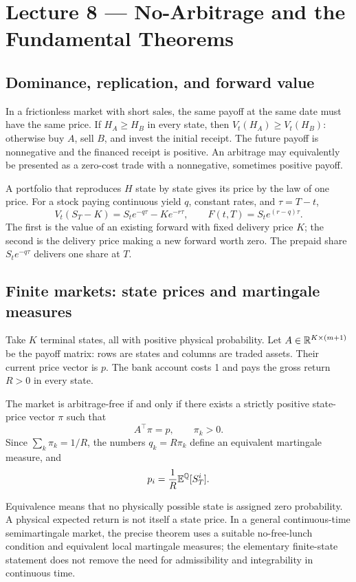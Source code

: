 
\section{Lecture 8 --- No-Arbitrage and the Fundamental Theorems}
\label{syn:lecture8}

\subsection{Dominance, replication, and forward value}
In a frictionless market with short sales, the same payoff at the same date
must have the same price. If \(H_A\geq H_B\) in every state, then
\(V_t(H_A)\geq V_t(H_B)\): otherwise buy \(A\), sell \(B\), and invest
the initial receipt. The future payoff is nonnegative and the financed
receipt is positive. An arbitrage may equivalently be presented as a
zero-cost trade with a nonnegative, sometimes positive payoff.

A portfolio that reproduces \(H\) state by state gives its price by the
law of one price. For a stock paying continuous yield \(q\), constant
rates, and \(\tau=T-t\),
\[
\boxed{V_t(S_T-K)=S_t e^{-q\tau}-Ke^{-r\tau},\qquad
F(t,T)=S_t e^{(r-q)\tau}.}
\]
The first is the value of an existing forward with fixed delivery price
\(K\); the second is the delivery price making a new forward worth zero.
The prepaid share \(S_t e^{-q\tau}\) delivers one share at \(T\).

\subsection{Finite markets: state prices and martingale measures}
Take \(K\) terminal states, all with positive physical probability.
Let \(A\in\mathbb{R}^{K\times(m+1)}\) be the payoff matrix: rows are states and
columns are traded assets. Their current price vector is \(p\). The bank
account costs 1 and pays the gross return \(R>0\) in every state.

\begin{theorem}
The market is arbitrage-free if and only if there exists a strictly
positive state-price vector \(\pi\) such that
\[
\boxed{A^\top\pi=p,\qquad \pi_k>0.}
\]
Since \(\sum_k\pi_k=1/R\), the numbers \(q_k=R\pi_k\) define an
equivalent martingale measure, and
\[
p_i=\frac1R\mathbb{E}^{\mathbb{Q}}[S_T^i].
\]
\end{theorem}
Equivalence means that no physically possible state is assigned zero
probability. A physical expected return is not itself a state price.
In a general continuous-time semimartingale market, the precise theorem
uses a suitable no-free-lunch condition and equivalent local martingale
measures; the elementary finite-state statement does not remove the need
for admissibility and integrability in continuous time.

